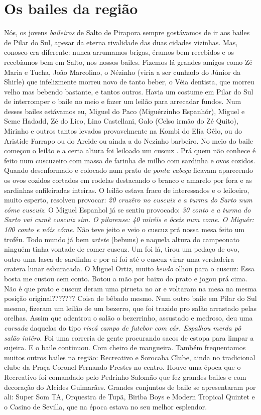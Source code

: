 \documentclass[12pt,brazil,]{book}
\begin{document}
\section{Os bailes da região}\label{os-bailes-da-regiuxe3o}

Nós, os jovens \emph{baileiros} de Salto de Pirapora sempre gostávamos
de ir aos bailes de Pilar do Sul, apesar da eterna rivalidade das duas
cidades vizinhas. Mas, conosco era diferente: nunca arrumamos brigas,
éramos bem recebidos e os recebíamos bem em Salto, nos nossos bailes.
Fizemos lá grandes amigos como Zé Maria e Tucha, João Marcolino, o
Nézinho (viria a ser cunhado do Júnior da Shirle) que infelizmente
morreu novo de tanto beber, o Véia dentista, que morreu velho mas
bebendo bastante, e tantos outros. Havia um costume em Pilar do Sul de
interromper o baile no meio e fazer um leilão para arrecadar fundos. Num
desses bailes estávamos eu, Miguel do Paco (Miguérzinho Espanhór),
Miguel e Seme Hadadd, Zé do Lico, Lino Castellani, Galo (Celso irmão do
Zé Quito), Mirinho e outros tantos levados provavelmente na Kombi do
Elía Gêlo, ou do Aristide Farrapo ou do Arcide ou ainda a do Nezinho
barbeiro. No meio do baile começou o leilão e a certa altura foi
leiloado um cuscuz . Prá quem não conhece é feito num cuscuzeiro com
massa de farinha de milho com sardinha e ovos cozidos. Quando
desenformado e colocado num prato de \emph{ponta cabeça} ficavam
aparecendo os ovos cozidos cortados em rodelas destacando o branco e
amarelo por fora e as sardinhas enfileiradas inteiras. O leilão estava
fraco de interessados e o leiloeiro, muito esperto, resolveu provocar:
\emph{20 cruzêro no cuscuiz e a turma do Sarto num cóme cuscuiz}. O
Miguel Espanhol já se sentiu provocado: \emph{30 conto e a turma do
Sarto vai cumê cuscuiz sim. O pilarense: 40 miréis e ôceis num come. O
Miguér: 100 conto e nóis cóme}. Não teve jeito e veio o cuscuz prá nossa
mesa feito um troféu. Todo mundo já bem \emph{artete} (bebuns) e naquela
altura do campeonato ninguém tinha vontade de comer cuscuz. Um foi lá,
tirou um pedaço de ovo, outro uma lasca de sardinha e por aí foi até o
cuscuz virar uma verdadeira cratera lunar esburacada. O Miguel Ortiz,
muito \emph{beudo} olhou para o cuscuz: Essa bosta me custou cem conto.
Botou a mão por baixo do prato e jogou prá cima. Não é que prato e
cuscuz deram uma pirueta no ar e voltaram na mesa na mesma posição
original??????? Coisa de bêbado mesmo. Num outro baile em Pilar do Sul
mesmo, fizeram um leilão de um bezerro, que foi trazido pro salão
arrastado pelas orelhas. Assim que adentrou o salão o bezerrinho,
assustado e medroso, deu uma \emph{cursada} daquelas do tipo \emph{riscá
campo de futebor com cár. Espalhou merda pô salão intêro}. Foi uma
correria de gente procurando sacos de estopa para limpar a sujeira. E o
baile continuou. Com cheiro de mangueira. Também frequentamos muitos
outros bailes na região: Recreativo e Sorocaba Clube, ainda no
tradicional clube da Praça Coronel Fernando Prestes no centro. Houve uma
época que o Recreativo foi comandado pelo Pedrinho Salomão que fez
grandes bailes e com decoração do Alcides Guimarães. Grandes conjuntos
de baile se apresentaram por ali: Super Som TA, Orquestra de Tupã,
Biriba Boys e Modern Tropical Quintet e o Casino de Sevilla, que na
época estava no seu melhor esplendor.
\end{document}
